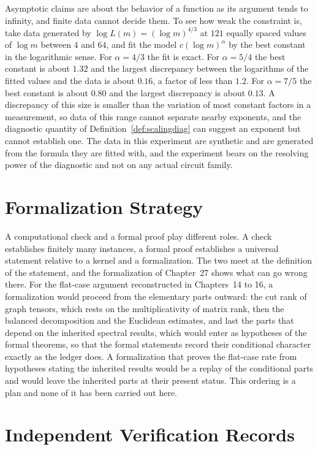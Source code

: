 \documentclass[11pt,letterpaper]{report}
\theoremstyle{plain}
\theoremstyle{definition}
\theoremstyle{remark}
\begin{document}
Asymptotic claims are about the behavior of a function as its argument tends to infinity, and finite data cannot decide them. To see how weak the constraint is, take data generated by $\log L(m)=(\log m)^{4/3}$ at $121$ equally spaced values of $\log m$ between $4$ and $64$, and fit the model $c(\log m)^{\alpha}$ by the best constant in the logarithmic sense. For $\alpha=4/3$ the fit is exact. For $\alpha=5/4$ the best constant is about $1.32$ and the largest discrepancy between the logarithms of the fitted values and the data is about $0.16$, a factor of less than $1.2$. For $\alpha=7/5$ the best constant is about $0.80$ and the largest discrepancy is about $0.13$. A discrepancy of this size is smaller than the variation of most constant factors in a measurement, so data of this range cannot separate nearby exponents, and the diagnostic quantity of Definition~\ref{def:scalingdiag} can suggest an exponent but cannot establish one. The data in this experiment are synthetic and are generated from the formula they are fitted with, and the experiment bears on the resolving power of the diagnostic and not on any actual circuit family.

\section{Formalization Strategy}

A computational check and a formal proof play different roles. A check establishes finitely many instances, a formal proof establishes a universal statement relative to a kernel and a formalization. The two meet at the definition of the statement, and the formalization of Chapter~27 shows what can go wrong there. For the flat-case argument reconstructed in Chapters~14 to 16, a formalization would proceed from the elementary parts outward: the cut rank of graph tensors, which rests on the multiplicativity of matrix rank, then the balanced decomposition and the Euclidean estimates, and last the parts that depend on the inherited spectral results, which would enter as hypotheses of the formal theorems, so that the formal statements record their conditional character exactly as the ledger does. A formalization that proves the flat-case rate from hypotheses stating the inherited results would be a replay of the conditional parts and would leave the inherited parts at their present status. This ordering is a plan and none of it has been carried out here.

\section{Independent Verification Records}
\end{document}
